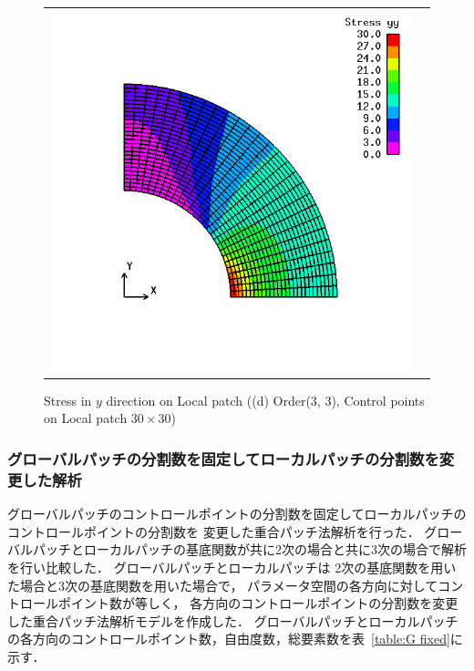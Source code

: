 \begin{figure}[htbp]
\begin{tabular}{cc}
\begin{minipage}[t]{0.45\hsize}
      \includegraphics[keepaspectratio, scale=0.3]
      {fig/result_data_etc/s-iga01/contour/3_3.png}
      \caption{Stress in $y$ direction on Local patch ((d) Order(3, 3), Control points on Local patch $30\times 30$)}
      \label{fig:contour33}
    \end{minipage}
  \end{tabular}
\end{figure}

\newpage

\subsubsection{グローバルパッチの分割数を固定してローカルパッチの分割数を変更した解析}
グローバルパッチのコントロールポイントの分割数を固定してローカルパッチのコントロールポイントの分割数を
変更した重合パッチ法解析を行った．
グローバルパッチとローカルパッチの基底関数が共に2次の場合と共に3次の場合で解析を行い比較した．
グローバルパッチとローカルパッチは
2次の基底関数を用いた場合と3次の基底関数を用いた場合で，
パラメータ空間の各方向に対してコントロールポイント数が等しく，
各方向のコントロールポイントの分割数を変更した重合パッチ法解析モデルを作成した．
グローバルパッチとローカルパッチの各方向のコントロールポイント数，自由度数，総要素数を表~\ref{table:G fixed}に示す．

